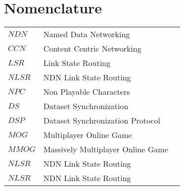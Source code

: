 \tableofcontents
\listoffigures
\listoftables
\lstlistoflistings
\newpage


\section*{Nomenclature}
\begin{tabular}{lp{15cm}l}
    $NDN$ & Named Data Networking \\
    $CCN$ & Content Centric Networking \\
    $LSR$ & Link State Routing \\
    $NLSR$ & NDN Link State Routing \\
    $NPC$ & Non Playable Characters \\
    $DS$ & Dataset Synchronization \\
    $DSP$ & Dataset Synchronization Protocol \\
    $MOG$ & Multiplayer Online Game \\
    $MMOG$ & Massively Multiplayer Online Game \\
    $NLSR$ & NDN Link State Routing \\
    $NLSR$ & NDN Link State Routing \\
\end{tabular}
\vspace{2cm}
